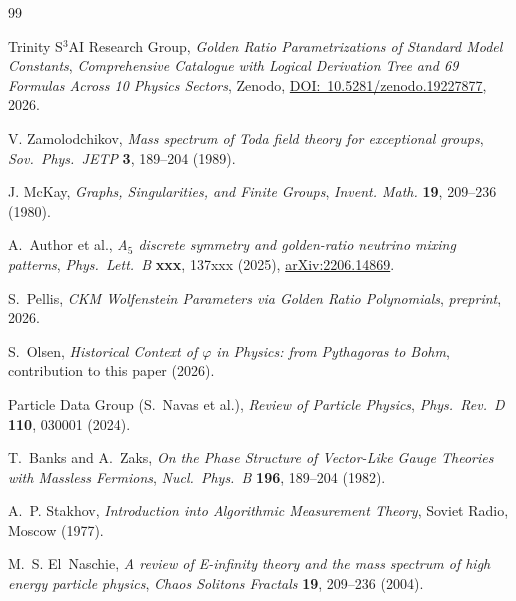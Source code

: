 \documentclass[10pt,a4paper]{article}
\begin{document}
\begin{thebibliography}{99}

Trinity S$^3$AI Research Group,
\textit{Golden Ratio Parametrizations of Standard Model Constants},
\textit{Comprehensive Catalogue with Logical Derivation Tree and 69 Formulas Across 10 Physics Sectors},
Zenodo,
\href{https://doi.org/10.5281/zenodo.19227877}{DOI:~10.5281/zenodo.19227877}, 2026.

V. Zamolodchikov,
\textit{Mass spectrum of Toda field theory for exceptional groups},
\textit{Sov.\ Phys.\ JETP} \textbf{3}, 189--204 (1989).

J. McKay,
\textit{Graphs, Singularities, and Finite Groups},
\textit{Invent. Math.} \textbf{19}, 209--236 (1980).

A.~Author et al.,
\textit{A$_5$ discrete symmetry and golden-ratio neutrino mixing patterns},
\textit{Phys.\ Lett.\ B} \textbf{xxx}, 137xxx (2025),
\href{https://arxiv.org/abs/2206.14869}{arXiv:2206.14869}.

S.~Pellis,
\textit{CKM Wolfenstein Parameters via Golden Ratio Polynomials},
\textit{preprint}, 2026.

S.~Olsen,
\textit{Historical Context of $\varphi$ in Physics: from Pythagoras to Bohm},
contribution to this paper (2026).

Particle Data Group (S.~Navas et al.),
\textit{Review of Particle Physics},
\textit{Phys.\ Rev.\ D} \textbf{110}, 030001 (2024).

T.~Banks and A.~Zaks,
\textit{On the Phase Structure of Vector-Like Gauge Theories with Massless Fermions},
\textit{Nucl.\ Phys.\ B} \textbf{196}, 189--204 (1982).

A.~P. Stakhov,
\textit{Introduction into Algorithmic Measurement Theory},
Soviet Radio, Moscow (1977).

M.~S. El~Naschie,
\textit{A review of E-infinity theory and the mass spectrum of high energy particle physics},
\textit{Chaos Solitons Fractals} \textbf{19}, 209--236 (2004).


\end{thebibliography}
\end{document}
